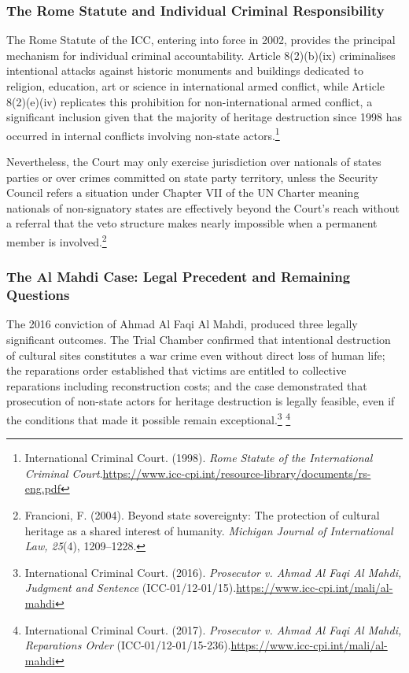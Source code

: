 \subsubsection{The Rome Statute and Individual Criminal Responsibility}

The Rome Statute of the ICC, entering into force in 2002, provides the principal mechanism for individual criminal accountability. Article 8(2)(b)(ix) criminalises intentional attacks against historic monuments and buildings dedicated to religion, education, art or science in international armed conflict, while Article 8(2)(e)(iv) replicates this prohibition for non-international armed conflict, a significant inclusion given that the majority of heritage destruction since 1998 has occurred in internal conflicts involving non-state actors.\footnote{International Criminal Court. (1998). \emph{Rome Statute of the International Criminal Court}.\url{https://www.icc-cpi.int/resource-library/documents/rs-eng.pdf}}

Nevertheless, the Court may only exercise jurisdiction over nationals of states parties or over crimes committed on state party territory, unless the Security Council refers a situation under Chapter VII of the UN Charter meaning nationals of non-signatory states are effectively beyond the Court's reach without a referral that the veto structure makes nearly impossible when a permanent member is involved.\footnote{Francioni, F. (2004). Beyond state sovereignty: The protection of cultural heritage as a shared interest of humanity. \emph{Michigan Journal of International Law, 25}(4), 1209–1228.}

\subsubsection{The Al Mahdi Case: Legal Precedent and Remaining Questions}

The 2016 conviction of Ahmad Al Faqi Al Mahdi, produced three legally significant outcomes. The Trial Chamber confirmed that intentional destruction of cultural sites constitutes a war crime even without direct loss of human life; the reparations order established that victims are entitled to collective reparations including reconstruction costs; and the case demonstrated that prosecution of non-state actors for heritage destruction is legally feasible, even if the conditions that made it possible remain exceptional.\footnote{International Criminal Court. (2016). \emph{Prosecutor v. Ahmad Al Faqi Al Mahdi, Judgment and Sentence} (ICC-01/12-01/15).\url{https://www.icc-cpi.int/mali/al-mahdi}} \footnote{International Criminal Court. (2017). \emph{Prosecutor v. Ahmad Al Faqi Al Mahdi, Reparations Order} (ICC-01/12-01/15-236).\url{https://www.icc-cpi.int/mali/al-mahdi}}

